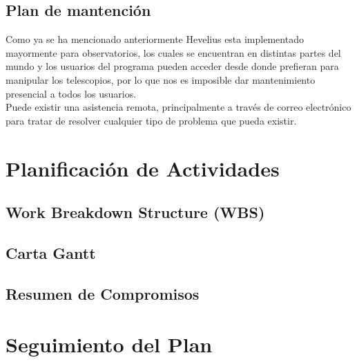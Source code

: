 \documentclass[letterpaper,spanish,10pt]{article}
\begin{document}
\subsection{Plan de mantenci\'on}
Como ya se ha mencionado anteriormente Hevelius esta implementado mayormente para observatorios, los cuales se encuentran en distintas partes del mundo y los usuarios del programa pueden acceder desde donde prefieran para manipular los telescopios, por lo que nos es imposible dar mantenimiento presencial a todos los usuarios.\\
 Puede existir una asistencia remota, principalmente a trav\'es de correo electr\'onico para tratar de resolver cualquier tipo de problema que pueda existir.




\newpage
\section{Planificaci\'on de Actividades} %
\subsection{Work Breakdown Structure (WBS)}



\subsection{Carta Gantt}



\subsection{Resumen de Compromisos}



\newpage
\section{Seguimiento del Plan} %
\end{document}
